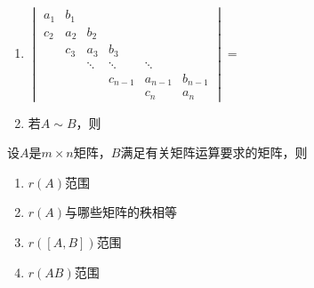 \documentclass[a4paper,12pt]{article}
\begin{document}
    \begin{minipage}[t]{0.30\textwidth}
        \begin{enumerate}[leftmargin=*, itemsep=1.1em]
            \item $\begin{vmatrix}
                       a_1 & b_1 &        &        & &        \\
                       c_2 & a_2 & b_2    &        & &        \\
                       & c_3 & a_3    & b_3 & &       \\
                       &     & \ddots & \ddots & \ddots &\\
                       &     &        & c_{n-1}& a_{n-1} & b_{n-1} \\
                       &     &        && c_{n}& a_n
            \end{vmatrix} =$
        \end{enumerate}
    \end{minipage}
    \hfill
    \begin{minipage}[t]{0.56\textwidth}
        \begin{enumerate}[leftmargin=*, itemsep=1.1em]
            \setcounter{enumi}{1}
            \item 若$A \sim B$，则
        \end{enumerate}
    \end{minipage}

    \hspace{-0.8em}设$A$是$m \times n$矩阵，$B$满足有关矩阵运算要求的矩阵，则

    \begin{minipage}[t]{1\textwidth}
        \begin{enumerate}[leftmargin=0.2em, itemsep=1.1em]
        \item $r(A)$范围
        \item $r(A)$与哪些矩阵的秩相等
        \item $r([A, B])$范围
        \item $r(AB)$范围
        \end{enumerate}
    \end{minipage}

    \vspace{1em}
\end{document}
